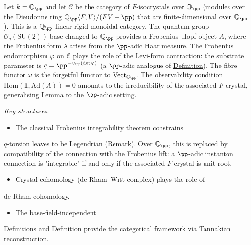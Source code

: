\begin{example}
  \label{ex:p-adic-realisation}
Let $k = \mathbb{Q}_\pp$ and let $\mathcal{C}$ be the category of
$F$-isocrystals over $\mathbb{Q}_\pp$ (modules over the Dieudonne ring
$\mathbb{Q}_\pp\langle F, V \rangle / (FV - \pp)$ that are finite-dimensional
over $\mathbb{Q}_\pp$).
This is a $\mathbb{Q}_\pp$-linear rigid monoidal category.
The quantum group $\mathcal{O}_q(\mathrm{SU}(2))$ base-changed
to $\mathbb{Q}_\pp$ provides a Frobenius--Hopf object $A$, where the
Frobenius form $\lambda$ arises from the $\pp$-adic Haar measure.
The Frobenius endomorphism $\varphi$ on $\mathcal{C}$ plays the
role of the Levi-form contraction: the substrate parameter is
$q = \pp^{\,-v_\pp(\det\varphi)}$ (a $\pp$-adic analogue of
\hyperref[def:substrate-parameter]{Definition}).  The fibre functor $\omega$
is the forgetful functor to $\mathrm{Vect}_{\mathbb{Q}_\pp}$.
The observability condition
$\mathrm{Hom}(\mathbf{1}, \mathrm{Ad}(A)) = 0$ amounts to the
irreducibility of the associated $F$-crystal, generalising
\hyperref[lem:irreducible-connection]{Lemma} to the $\pp$-adic setting.

\emph{Key structures.}

\begin{itemize}
  \item The classical Frobenius integrability theorem constrains
\end{itemize}
  $q$-torsion leaves to be Legendrian
  (\hyperref[rem:q-torsion-existence]{Remark}).  Over $\mathbb{Q}_\pp$,
  this is replaced by compatibility of the connection with the
  Frobenius lift: a $\pp$-adic instanton connection is
  "integrable" if and only if the associated $F$-crystal is
  unit-root.
\begin{itemize}
  \item Crystal cohomology (de Rham--Witt complex) plays the role of
\end{itemize}
  de Rham cohomology.
\begin{itemize}
  \item The base-field-independent
\end{itemize}
  \hyperref[def:quantum-universe]{Definitions}
  and \hyperref[def:quantum-observable-universe]{Definition} provide the categorical
  framework via Tannakian reconstruction.
\end{example}


